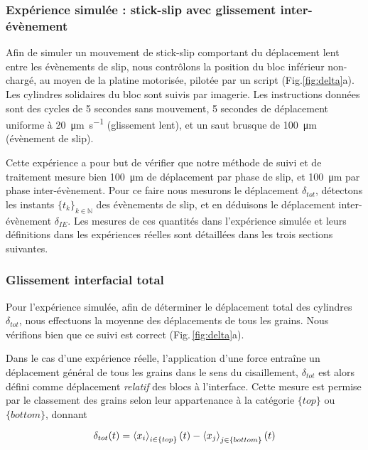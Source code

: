\subsubsection{Expérience simulée : stick-slip avec glissement inter-évènement}



Afin de simuler un mouvement de stick-slip comportant du déplacement lent entre les évènements de slip, nous contrôlons la position du bloc inférieur non-chargé, au moyen de la platine motorisée, pilotée par un script (Fig.\ref{fig:delta}a). Les cylindres solidaires du bloc sont suivis par imagerie. Les instructions données sont des cycles de 5 secondes sans mouvement, 5 secondes de déplacement uniforme à \SI{20}{\micro\meter\per\second} (glissement lent), et un saut brusque de \SI{100}{\micro\meter} (évènement de slip).


Cette expérience a pour but de vérifier que notre méthode de suivi et de traitement mesure bien \SI{100}{\micro\meter} de déplacement par phase de slip, et \SI{100}{\micro\meter} par phase inter-évènement. Pour ce faire nous mesurons le déplacement $\delta_{tot}$, détectons les instants $\{t_{k}\}_{k\in\mathbb{N}}$ des évènements de slip, et en déduisons le déplacement inter-évènement $\delta_{IE}$. Les mesures de ces quantités dans l’expérience simulée et leurs définitions dans les expériences réelles sont détaillées dans les trois sections suivantes.




\subsubsection{Glissement interfacial total}
\label{sec:totslip}

Pour l'expérience simulée, afin de déterminer le déplacement total des cylindres $\delta_{tot}$, nous effectuons la moyenne des déplacements de tous les grains. Nous vérifions bien que ce suivi est correct (Fig.\,\ref{fig:delta}a).


Dans le cas d'une expérience réelle, l'application d'une force entraîne un déplacement général de tous les grains dans le sens du cisaillement, $\delta_{tot}$ est alors défini comme déplacement \textit{relatif} des blocs à l'interface. Cette mesure est permise par le classement des grains selon leur appartenance à la catégorie $\{top\}$ ou $\{bottom\}$, donnant

\begin{equation}
\delta_{tot}(t) = \left\langle {x_i} \right\rangle_{i\in\{top\}}(t) - \left\langle {x_j} \right\rangle_{j\in\{bottom\}}(t)
\end{equation}


